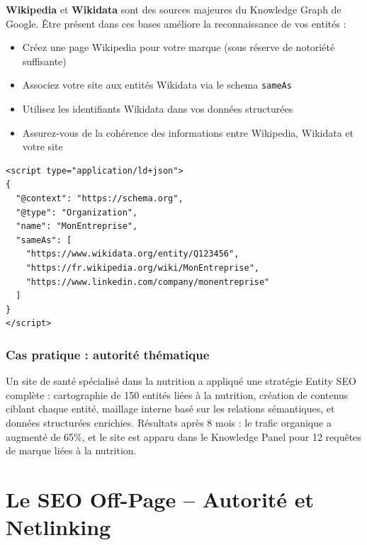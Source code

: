 \documentclass[12pt,a4paper,twoside]{report}
\newcommand{\keyword}[1]{\textbf{\textcolor{googleblue}{#1}}}
\begin{document}
\keyword{Wikipedia} et \keyword{Wikidata} sont des sources majeures du Knowledge Graph de Google. Être présent dans ces bases améliore la reconnaissance de vos entités :

\begin{itemize}
    \item Créez une page Wikipedia pour votre marque (sous réserve de notoriété suffisante)
    \item Associez votre site aux entités Wikidata via le schema \texttt{sameAs}
    \item Utilisez les identifiants Wikidata dans vos données structurées
    \item Assurez-vous de la cohérence des informations entre Wikipedia, Wikidata et votre site
\end{itemize}

\begin{lstlisting}[style=htmlcode,caption={Association d'entités via sameAs}]
<script type="application/ld+json">
{
  "@context": "https://schema.org",
  "@type": "Organization",
  "name": "MonEntreprise",
  "sameAs": [
    "https://www.wikidata.org/entity/Q123456",
    "https://fr.wikipedia.org/wiki/MonEntreprise",
    "https://www.linkedin.com/company/monentreprise"
  ]
}
</script>
\end{lstlisting}

\section{Cas pratique : autorité thématique}

Un site de santé spécialisé dans la nutrition a appliqué une stratégie Entity SEO complète : cartographie de 150 entités liées à la nutrition, création de contenus ciblant chaque entité, maillage interne basé sur les relations sémantiques, et données structurées enrichies. Résultats après 8 mois : le trafic organique a augmenté de 65\%, et le site est apparu dans le Knowledge Panel pour 12 requêtes de marque liées à la nutrition.


\part{Le SEO Off-Page -- Autorité et Netlinking}
\label{part:offpage}
\end{document}
